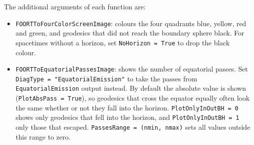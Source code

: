 \documentclass[11pt,a4paper]{article}
\newcommand{\code}[1]{{\tt #1}}
\begin{document}
The additional arguments of each function are:
\begin{itemize}
 \item \code{FOORTToFourColorScreenImage}: colours the four quadrants blue, yellow, red and green, and geodesics that did not reach the boundary sphere black. For spacetimes without a horizon, set \code{NoHorizon = True} to drop the black colour.
 \item \code{FOORTToEquatorialPassesImage}: shows the number of equatorial passes. Set \code{DiagType = "EquatorialEmission"} to take the passes from \code{EquatorialEmission} output instead. By default the absolute value is shown (\code{PlotAbsPass = True}), so geodesics that cross the equator equally often look the same whether or not they fall into the horizon. \code{PlotOnlyInOutBH = 0} shows only geodesics that fell into the horizon, and \code{PlotOnlyInOutBH = 1} only those that escaped. \code{PassesRange = (nmin, nmax)} sets all values outside this range to zero.
 

\end{itemize}
\end{document}
